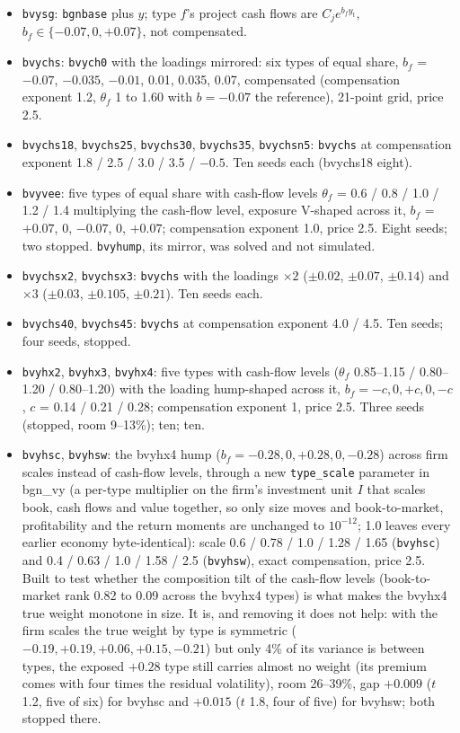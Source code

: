 \documentclass[11pt]{article}
\begin{document}
\begin{itemize}
\item \texttt{bvysg}: \texttt{bgnbase} plus $y$; type $f$'s project cash flows are $C_j e^{b_f y_t}$, $b_f\in\{-0.07,0,+0.07\}$, not compensated.
\item \texttt{bvychs}: \texttt{bvych0} with the loadings mirrored: six types of equal share, $b_f$ = $-0.07$, $-0.035$, $-0.01$, 0.01, 0.035, 0.07, compensated (compensation exponent 1.2, $\theta_f$ 1 to 1.60 with $b=-0.07$ the reference), 21-point grid, price 2.5.
\item \texttt{bvychs18}, \texttt{bvychs25}, \texttt{bvychs30}, \texttt{bvychs35}, \texttt{bvychsn5}: \texttt{bvychs} at compensation exponent 1.8 / 2.5 / 3.0 / 3.5 / $-0.5$. Ten seeds each (bvychs18 eight).
\item \texttt{bvyvee}: five types of equal share with cash-flow levels $\theta_f$ = 0.6 / 0.8 / 1.0 / 1.2 / 1.4 multiplying the cash-flow level, exposure V-shaped across it, $b_f$ = $+0.07$, 0, $-0.07$, 0, $+0.07$; compensation exponent 1.0, price 2.5. Eight seeds; two stopped. \texttt{bvyhump}, its mirror, was solved and not simulated.
\item \texttt{bvychsx2}, \texttt{bvychsx3}: \texttt{bvychs} with the loadings $\times2$ ($\pm0.02$, $\pm0.07$, $\pm0.14$) and $\times3$ ($\pm0.03$, $\pm0.105$, $\pm0.21$). Ten seeds each.
\item \texttt{bvychs40}, \texttt{bvychs45}: \texttt{bvychs} at compensation exponent 4.0 / 4.5. Ten seeds; four seeds, stopped.
\item \texttt{bvyhx2}, \texttt{bvyhx3}, \texttt{bvyhx4}: five types with cash-flow levels ($\theta_f$ 0.85--1.15 / 0.80--1.20 / 0.80--1.20) with the loading hump-shaped across it, $b_f=-c,0,+c,0,-c$, $c$ = 0.14 / 0.21 / 0.28; compensation exponent 1, price 2.5. Three seeds (stopped, room 9--13\%); ten; ten.
\item \texttt{bvyhsc}, \texttt{bvyhsw}: the bvyhx4 hump ($b_f = -0.28, 0, +0.28, 0, -0.28$) across firm scales instead of cash-flow levels, through a new \texttt{type\_scale} parameter in bgn\_vy (a per-type multiplier on the firm's investment unit $I$ that scales book, cash flows and value together, so only size moves and book-to-market, profitability and the return moments are unchanged to $10^{-12}$; 1.0 leaves every earlier economy byte-identical): scale 0.6 / 0.78 / 1.0 / 1.28 / 1.65 (\texttt{bvyhsc}) and 0.4 / 0.63 / 1.0 / 1.58 / 2.5 (\texttt{bvyhsw}), exact compensation, price 2.5. Built to test whether the composition tilt of the cash-flow levels (book-to-market rank 0.82 to 0.09 across the bvyhx4 types) is what makes the bvyhx4 true weight monotone in size. It is, and removing it does not help: with the firm scales the true weight by type is symmetric ($-0.19, +0.19, +0.06, +0.15, -0.21$) but only 4\% of its variance is between types, the exposed $+0.28$ type still carries almost no weight (its premium comes with four times the residual volatility), room 26--39\%, gap $+0.009$ ($t$ 1.2, five of six) for bvyhsc and $+0.015$ ($t$ 1.8, four of five) for bvyhsw; both stopped there.

\end{itemize}
\end{document}
